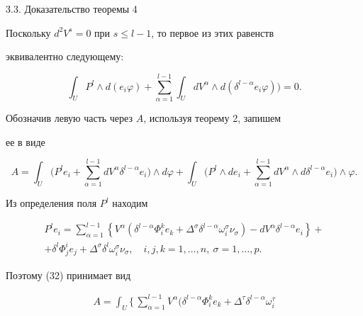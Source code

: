 \begin{pf*}{3.3. Доказательство теоремы 4}
\begin{equation}
\end{equation}





Поскольку $d^2V^s=0$ при $s\le l-1$, то первое из этих равенств


эквивалентно следующему:


$$


\int_{U}P^l\wedge d(e_i\varphi)+\sum_{\alpha=1}^{l-1}\int_{U}dV^{\alpha}


\wedge d(\delta^{l-\alpha}e_i\varphi))=0.


$$


Обозначив левую часть через $A$, используя теорему 2, запишем


ее в виде


\begin{equation}


A=\int_{U}\biggl(P^le_i+\sum_{\alpha=1}^{l-1}dV^{\alpha}\delta^{l-\alpha}


e_i\biggr)\wedge d\varphi+


\int_{U}\biggl(P^l\wedge de_i+


\sum_{\alpha=1}^{l-1}dV^{\alpha}\wedge d\delta^{l-\alpha}e_i\biggr)


\wedge\varphi.


\end{equation}


Из определения поля $P^l$ находим


\begin{multline*}


P^le_i=\sum_{\alpha=1}^{l-1}\left\{V^{\alpha}(\delta^{l-\alpha}


\Phi^k_ie_k+\Delta^{\sigma}\delta^{l-\alpha}\omega^{\sigma}_i


\nu_{\sigma})-dV^{\alpha}\delta^{l-\alpha}e_i\right\}+\\


+\delta^l\Phi^i_je_j+\Delta^{\sigma}\delta^l\omega^{\sigma}_i


\nu_{\sigma},\quad i,j,k=1,\dotsc,n, \ \sigma=1,\dotsc,p.


\end{multline*}


Поэтому (32) принимает вид


\begin{multline*}


A=\int_{U}\biggl\{\,\sum_{\alpha=1}^{l-1}V^{\alpha}(\delta^{l-\alpha}


\Phi^k_ie_k+\Delta^{\tau}\delta^{l-\alpha}\omega^{\tau}_i



\end{multline*}
\end{pf*}
